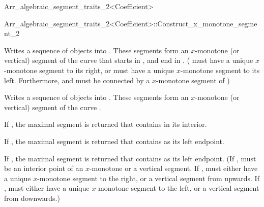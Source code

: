 \begin{ccRefClass}{Arr_algebraic_segment_traits_2<Coefficient>}
\begin{ccClass}{Arr_algebraic_segment_traits_2<Coefficient>::Construct_x_monotone_segment_2}


        {Writes a sequence of  objects into .
         These segments form an $x$-monotone (or vertical) 
         segment of the curve  
         that starts in , and end in .
         \ccPrecond( must have a unique $x$-monotone segment
                    to its right, or  must have a unique
                    $x$-monotone segment to its left. Furthermore, 
                     and  must be connected
                    by a $x$-monotone segment of )}

        {Writes a sequence of  objects into .
         These segments form an $x$-monotone (or vertical) 
         segment of the curve .

         If , the maximal segment is
         returned that contains  in its interior.

         If , the maximal segment is
         returned that contains  as its left endpoint.

         If , the maximal segment is
         returned that contains  as its left endpoint.
         \ccPrecond(If , 
                    must be an interior point of an $x$-monotone or a vertical
                    segment.
                    If , 
                    must either have a unique $x$-monotone segment to the right,
                    or a vertical segment from  upwards.
                    If , 
                    must either have a unique $x$-monotone segment to the left,
                    or a vertical segment from  downwards.)}


\end{ccClass}
\end{ccRefClass}
